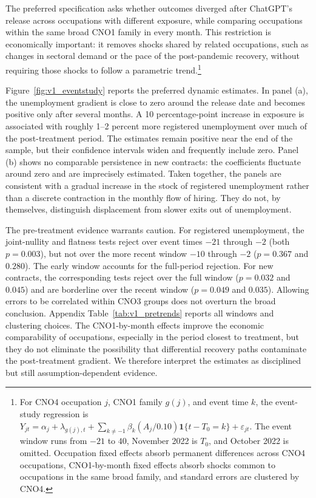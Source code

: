 \documentclass[11pt]{article}
\begin{document}
The preferred specification asks whether outcomes diverged after ChatGPT's release across occupations with different exposure, while comparing occupations within the same broad CNO1 family in every month. This restriction is economically important: it removes shocks shared by related occupations, such as changes in sectoral demand or the pace of the post-pandemic recovery, without requiring those shocks to follow a parametric trend.\footnote{For CNO4 occupation \(j\), CNO1 family \(g(j)\), and event time \(k\), the event-study regression is \(Y_{jt}=\alpha_j+\lambda_{g(j),t}+\sum_{k\neq -1}\beta_k(A_j/0.10)\mathbf{1}\{t-T_0=k\}+\varepsilon_{jt}\). The event window runs from \(-21\) to \(40\), November 2022 is \(T_0\), and October 2022 is omitted. Occupation fixed effects absorb permanent differences across CNO4 occupations, CNO1-by-month fixed effects absorb shocks common to occupations in the same broad family, and standard errors are clustered by CNO4.}

Figure~\ref{fig:v1_eventstudy} reports the preferred dynamic estimates. In panel (a), the unemployment gradient is close to zero around the release date and becomes positive only after several months. A 10 percentage-point increase in exposure is associated with roughly 1--2 percent more registered unemployment over much of the post-treatment period. The estimates remain positive near the end of the sample, but their confidence intervals widen and frequently include zero. Panel (b) shows no comparable persistence in new contracts: the coefficients fluctuate around zero and are imprecisely estimated. Taken together, the panels are consistent with a gradual increase in the stock of registered unemployment rather than a discrete contraction in the monthly flow of hiring. They do not, by themselves, distinguish displacement from slower exits out of unemployment.

The pre-treatment evidence warrants caution. For registered unemployment, the joint-nullity and flatness tests reject over event times \(-21\) through \(-2\) (both \(p=0.003\)), but not over the more recent window \(-10\) through \(-2\) (\(p=0.367\) and \(0.280\)). The early window accounts for the full-period rejection. For new contracts, the corresponding tests reject over the full window (\(p=0.032\) and \(0.045\)) and are borderline over the recent window (\(p=0.049\) and \(0.035\)). Allowing errors to be correlated within CNO3 groups does not overturn the broad conclusion. Appendix Table~\ref{tab:v1_pretrends} reports all windows and clustering choices. The CNO1-by-month effects improve the economic comparability of occupations, especially in the period closest to treatment, but they do not eliminate the possibility that differential recovery paths contaminate the post-treatment gradient. We therefore interpret the estimates as disciplined but still assumption-dependent evidence.
\end{document}
